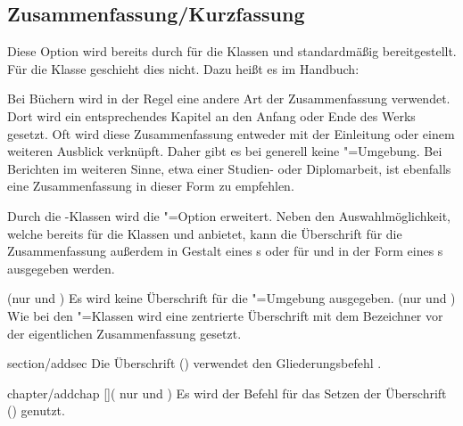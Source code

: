 \begin{Declaration*}{}
\begin{Declaration*}{}
\begin{Declaration*}{}
\subsection{Zusammenfassung/Kurzfassung}
%
%
\begin{Declaration}[%
  v2.02!\Option{abstract=multiple}:ersetzt \Option{abstract=double};%
  v2.02!\Option{abstract=tocleveldown};%
  v2.02!\Option{abstract=markboth};%
  v2.04!\Option{abstract=tocmultiple}%
]{}%
\printdeclarationlist%
%
%
Diese Option wird bereits durch \KOMAScript{} für die Klassen  
und  standardmäßig bereitgestellt. Für die Klasse 
 geschieht dies nicht. Dazu heißt es im Handbuch:
%
\begin{quoting}
Bei Büchern wird in der Regel eine andere Art der Zusammenfassung verwendet. 
Dort wird ein entsprechendes Kapitel an den Anfang oder Ende des Werks gesetzt. 
Oft wird diese Zusammenfassung entweder mit der Einleitung oder einem weiteren 
Ausblick verknüpft. Daher gibt es bei  generell keine 
"=Umgebung. Bei Berichten im weiteren Sinne, etwa einer 
Studien- oder Diplomarbeit, ist ebenfalls eine Zusammenfassung in dieser Form 
zu empfehlen.
\end{quoting}
%
Durch die \TUDScript-Klassen wird die "=Option erweitert. 
Neben den Auswahlmöglichkeit, welche bereits \KOMAScript{} für die Klassen 
 und  anbietet, kann die Überschrift für 
die Zusammenfassung außerdem in Gestalt eines \sectionautorefname{}s oder für 
 und  in der Form eines 
\chapterautorefname{}s ausgegeben werden.
%
\begin{values}{}
\itemfalse(nur  und )
  Es wird keine Überschrift für die "=Umgebung ausgegeben.
\itemtrue*(nur  und )
  Wie bei den \KOMAScript"=Klassen wird eine zentrierte Überschrift mit dem 
  Bezeichner  vor der eigentlichen Zusammenfassung gesetzt.
\item[section/addsec]
  Die Überschrift () verwendet den Gliederungsbefehl 
  .
\item[chapter/addchap][\Class{tudscrbook}](%
    nur  und %
  )
  Es wird der Befehl  für das Setzen der Überschrift 
  () genutzt. 

\end{values}
\end{Declaration}
\end{Declaration*}
\end{Declaration*}
\end{Declaration*}
